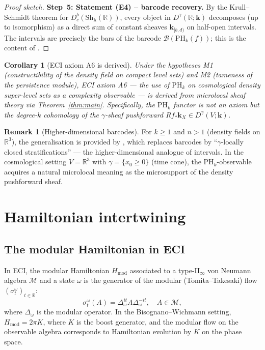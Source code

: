 \documentclass[12pt,a4paper]{amsart}
\newtheorem{corollary}[theorem]{Corollary}
\theoremstyle{definition}
\newtheorem{remark}[theorem]{Remark}
\newcommand{\R}{\mathbb{R}}
\newcommand{\kk}{\mathbf{k}}                %
\newcommand{\Sh}{\mathrm{Sh}}               %
\newcommand{\Dbc}{D^b_c}                     %
\newcommand{\PHk}{\mathrm{PH}_k}            %
\newcommand{\Dgamma}{D^\gamma}              %
\begin{document}
\begin{proof}[Proof sketch]
  \textbf{Step~5: Statement (E4) -- barcode recovery.}
  By the Krull--Schmidt theorem for $\Dbc(\Sh_\kk(\R))$, every object
  in $\Dgamma(\R;\kk)$ decomposes (up to isomorphism) as a direct sum of
  constant sheaves $\kk_{[b,d)}$ on half-open intervals.  The intervals
  are precisely the bars of the barcode $\mathcal{B}(\PHk(f))$; this is
  the content of \cite[Thm.~1.5]{KS2018}.
\end{proof}

\begin{corollary}[ECI axiom A6 is derived]
  \label{cor:A6-derived}
  Under the hypotheses M1 (constructibility of the density field on
  compact level sets) and M2 (tameness of the persistence module), ECI
  axiom A6 --- the use of $\PHk$ on cosmological density super-level
  sets as a complexity observable --- is derived from microlocal sheaf
  theory via Theorem~\ref{thm:main}.  Specifically, the $\PHk$ functor
  is not an axiom but the degree-$k$ cohomology of the $\gamma$-sheaf
  pushforward $Rf_*\kk_X \in \Dgamma(V;\kk)$.
\end{corollary}

\begin{remark}[Higher-dimensional barcodes]
  For $k \geq 1$ and $n > 1$ (density fields on $\R^3$), the
  generalisation is provided by \cite[Thm.~1.5]{KS2018}, which replaces
  barcodes by ``$\gamma$-locally closed stratifications'' --- the
  higher-dimensional analogue of intervals.  In the cosmological setting
  $V = \R^3$ with $\gamma = \{x_0 \geq 0\}$ (time cone), the
  $\PHk$-observable acquires a natural microlocal meaning as the
  microsupport of the density pushforward sheaf.
\end{remark}

\section{Hamiltonian intertwining}
\label{sec:hamiltonian}

\subsection{The modular Hamiltonian in ECI}

In ECI, the modular Hamiltonian $H_\mathrm{mod}$ associated to a
type-II$_\infty$ von Neumann algebra $\mathcal{M}$ and a state $\omega$
is the generator of the modular (Tomita--Takesaki) flow $(\sigma_t^\omega)_{t\in\R}$:
\[
  \sigma_t^\omega(A) = \Delta_\omega^{it} A \Delta_\omega^{-it},
  \quad A \in \mathcal{M},
\]
where $\Delta_\omega$ is the modular operator.  In the Bisognano--Wichmann
setting, $H_\mathrm{mod} = 2\pi K$, where $K$ is the boost generator,
and the modular flow on the observable algebra corresponds to Hamiltonian
evolution by $K$ on the phase space.
\end{document}
